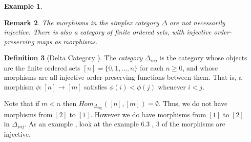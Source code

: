 \documentclass[11pt]{article}
\theoremstyle{definition}
\newtheorem{definition}{Definition}[section]
\newtheorem{example}[definition]{Example}
\theoremstyle{plain}
\newtheorem{remark}[definition]{Remark}
\begin{document}
\begin{example}
\begin{center}
    \end{center}

\end{example}

\begin{remark}
    The morphisms in the simplex category $\Delta$ are not necessarily injective. There is also a category of finite ordered sets, with injective order-preserving maps as morphisms.
\end{remark}

\begin{definition}[Delta Category ]
    The \emph{category} $\Delta_{inj} $ is the category whose objects are the finite ordered sets $[n] = \{0,1,\dots,n\}$ for each $n \geq 0$, and whose morphisms are all injective order-preserving  functions between them. That is, a morphism $\phi : [n] \to [m]$ satisfies $\phi(i) < \phi(j)$ whenever $i < j$.
\end{definition}
Note that if $ m<n$ then $Hom_{\Delta_{inj}}([n],[m]) = \emptyset$.
Thus, we do not have morphisms from $[2]$ to $[1]$. However we do have morphisms from $[1]$ to $[2]$ in $\Delta_{inj}$. As an example , look at the example 6.3 , 3 of the morphisms are injective.
\end{document}
